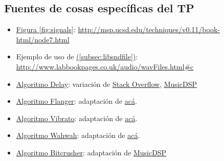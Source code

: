 \documentclass[a4paper,spanish,12pt]{article}
\newcommand*{\fullref}[1]{\hyperref[{#1}]{\nameref*{#1} (\autoref*{#1})}} %
\begin{document}
\subsection{Fuentes de cosas específicas del TP}
\begin{itemize}
\item \underline{Figura \ref{fig:signals}}: \url{http://msp.ucsd.edu/techniques/v0.11/book-html/node7.html}
\item Ejemplo de uso de \fullref{subsec:libsndfile}: \url{http://www.labbookpages.co.uk/audio/wavFiles.html#c}
\item \underline{Algoritmo Delay}: variación de \href{http://stackoverflow.com/questions/5318989/reverb-algorithm}{Stack Overflow}, \href{http://www.musicdsp.org/showArchiveComment.php?ArchiveID=153}{MusicDSP}
\item \underline{Algoritmo Flanger}: adaptación de \href{http://www.cs.cf.ac.uk/Dave/CM0268/Lecture_Examples/Digital_Audio_FX/flanger.m}{acá}.
\item \underline{Algoritmo Vibrato}: adaptación de \href{http://www.cs.cf.ac.uk/Dave/CM0268/Lecture_Examples/Digital_Audio_FX/vibrato.m}{acá}.
\item \underline{Algoritmo Wahwah}: adaptación de \href{http://www.cs.cf.ac.uk/Dave/CM0268/Lecture_Examples/Digital_Audio_FX/wah_wah.m}{acá}.
\item \underline{Algoritmo Bitcrusher}: adaptación de \href{http://www.musicdsp.org/showArchiveComment.php?ArchiveID=139}{MusicDSP}

\end{itemize}
\end{document}
